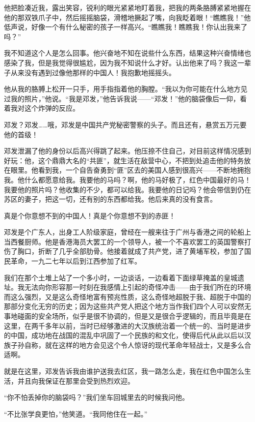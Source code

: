 \documentclass[10pt]{book}
\begin{document}
他把脸凑近我，露出笑容，锐利的眼光紧紧地盯着我，把我的两条胳膊紧紧地握在他的那双铁爪子中，然后摇摇脑袋，滑稽地撅起了嘴，向我眨着眼！“瞧瞧我！”他低声说，好像一个有什么秘密的孩子一样高兴。“瞧瞧我！瞧瞧我！你认出我来了吗？”

我不知道这个人是怎么回事。他兴奋地不知在说些什么东西，结果这种兴奋情绪也感染了我，但是我觉得很尴尬，因为我不知说什么才好。认出他来了吗？我这一辈子从来没有遇到过像他那样的中国人！我抱歉地摇摇头。

他从我的胳膊上松开一只手，用手指指着他的胸膛。“我以为你可能在什么地方见过我的照片，”他说。“我是邓发，”他告诉我说——“邓发！”他的脑袋像后一仰，看着我对这个炸弹的反应。

邓发？邓发……哦，邓发是中国共产党秘密警察的头子。而且还有，悬赏五万元要他的首级！

邓发泄漏了他的身份以后高兴得跳了起来。他压捺不住自己，对目前这样情况感到好玩：他，这个鼎鼎大名的“共匪”，就生活在敌营中心，不把到处追击他的特务放在眼里。他看到我，一个自告奋勇到“匪”区去的美国人感到很高兴——不断地拥抱我。他什么都愿意给我。我要他的马吗？啊，他的马好极了，红色中国最好的马！我要他的照片吗？他收集的不少，都可以给我。我要他的日记吗？他会带信到仍在苏区的妻子，把这一切，还有别的东西都给我。他后来真的没有食言。

真是个你意想不到的中国人！真是个你意想不到的赤匪！

邓发是个广东人，出身工人阶级家庭，曾经在一艘来往于广州与香港之间的轮船上当西餐厨师。他是香港海员大罢工的一个领导人，被一个不喜欢罢工的英国警察打伤了胸口，折断了几乎全部肋骨。他接着就成了共产党，进了黄埔军校，参加了国民革命，一九二七年以后到江西参加了红军。

我们在那个土堆上站了一个多小时，一边谈话，一边看着下面绿草掩盖的皇城遗址。我无法向你形容那一时刻在我感情上引起的奇怪冲击——由于我们所在的环境而这么强烈，又是这么奇怪地富有预兆性质，这么奇怪地超脱于我、超脱于中国的那部分变化无穷的历史；因为这些共产党人把这个地方当作我们四个人可以安然无事地碰面的安全场所，似乎是很不协调的，但是又是很合乎逻辑的，而且毕竟是在这里，在两千多年以前，当时已经够激进的大汉族统治着一个统一的、当时是进步的中国，成功地在战国的混乱中巩固了一个民族的和文化，使得后代从此以后以汉族子孙自称，就在这样的地方会见这个令人惊讶的现代革命年轻战士，又是多么合适啊。

就是在这里，邓发告诉我由谁护送我去红区，我一路怎么走，我在红色中国怎么生活，并且向我保证在那里会受到热烈欢迎。

“你不怕丢掉你的脑袋吗？”我们坐车回城里去的时候我问他。

“不比张学良更怕，”他笑道。“我同他住在一起。”
\end{document}
